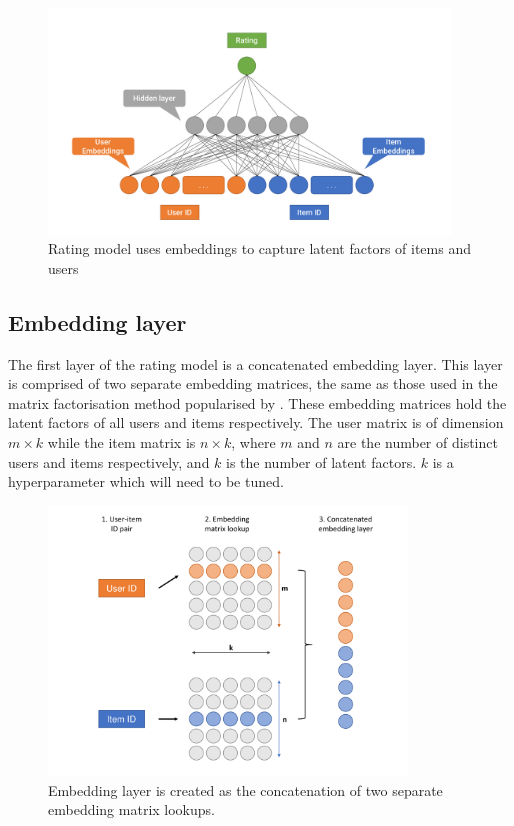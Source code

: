 \begin{figure}[H]
\centering
\includegraphics[width=0.95\textwidth]{Figures/4_ratings-model.pdf}
\decoRule
\caption[Rating model]{Rating model uses embeddings to capture latent factors of items and users}
\label{fig:4_rating-prediction-architecture}
\end{figure}

\subsection{Embedding layer}
The first layer of the rating model is a concatenated embedding layer. This layer is comprised of two separate embedding matrices, the same as those used in the matrix factorisation method popularised by \citeauthor{koren2009matrix}. These embedding matrices hold the latent factors of all users and items respectively. The user matrix is of dimension $m\times k$ while the item matrix is $n\times k$, where $m$ and $n$ are the number of distinct users and items respectively, and $k$ is the number of latent factors. $k$ is a hyperparameter which will need to be tuned.

\begin{figure}[H]
\centering
\includegraphics[width=0.85\textwidth]{Figures/4_CGT-embedding-layer.pdf}
\decoRule
\caption[Embedding layer]{Embedding layer is created as the concatenation of two separate embedding matrix lookups.}
\label{fig:4_CGT-embedding-layer}
\end{figure}

